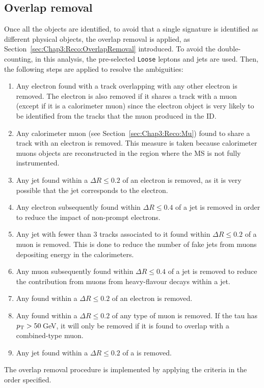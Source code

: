 %
%
\subsection{Overlap removal}
\label{sec:ChaptH:ObjectDefReco:OverlapRemoval}

Once all the objects are identified, to avoid that a single signature 
is identified as different physical objects, the overlap removal is applied, as
Section~\ref{sec:Chap3:Reco:OverlapRemoval} introduced.
To avoid the double-counting, in this analysis, the pre-selected \texttt{Loose} 
leptons and jets are used. Then, the following steps are applied to resolve
the ambiguities: %
\begin{enumerate}
  \item Any electron found with a track overlapping with any other electron is removed. 
  	The electron is also removed if it shares a track with a muon (except if it is a calorimeter muon) since the
  	electron object is very likely to be identified from the tracks that the muon produced in the ID.

  \item Any calorimeter muon (see Section~\ref{sec:Chap3:Reco:Mu}) found to share a track with an electron is removed.
  	This measure is taken because calorimeter muons objects are reconstructed in the region where the MS is not
	fully instrumented. 
  \item Any jet found within a $\Delta R \leq 0.2$ of an electron is removed, as it is very possible that the jet corresponds to the electron.
  \item Any electron subsequently found within $\Delta R \leq 0.4$ of a jet is removed in order to
  	reduce the impact of non-prompt electrons.
  \item Any jet with fewer than 3 tracks associated to it found within $\Delta R \leq 0.2$ of a muon is removed.
  	This is done to reduce the number of fake jets  from muons depositing energy in the calorimeters.
  \item Any muon subsequently found within $\Delta R \leq 0.4$ of a jet is removed to reduce the 
  	contribution from muons from heavy-flavour decays within a jet.
  \item Any \tauhad found within a $\Delta R \leq 0.2$ of an electron is removed.
  \item Any \tauhad found within a $\Delta R \leq 0.2$ of any type of muon is removed.
  	If the tau has $p_{\text{T}} > 50\,$GeV, it will only be removed if it is found to overlap with a combined-type muon.
  \item Any jet found within a $\Delta R \leq 0.2$ of a \tauhad is removed.
\end{enumerate}
The overlap removal procedure is implemented by applying the criteria in the order specified.%


